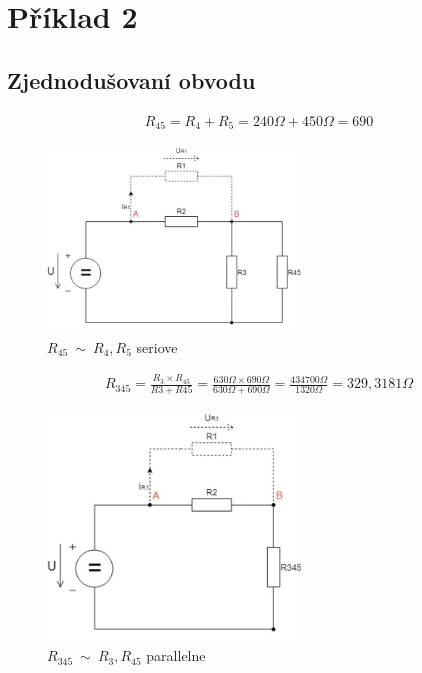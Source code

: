 \section{Příklad 2}
\subsection{Zjednodušovaní obvodu}
\begin{align*}
R_{45} = R_4 + R_5 = 240\Omega + 450\Omega = 690
\end{align*}

\begin{figure}[H]
    \centering
    \includegraphics[width=0.6\textwidth]{fig/Pr2_1.png}
    \caption{$R_{45}~\sim~R_4,R_5$ seriove}
\end{figure}


\begin{align*}
R_{345} = \frac {R_3 \times R_{45}} {R3 + R45} = \frac {630\Omega \times 690\Omega} {630\Omega + 690\Omega} = \frac {434 700\Omega} {1320\Omega} = 329,3181\Omega
\end{align*}

\begin{figure}[H]
    \centering
    \includegraphics[width=0.6\textwidth]{fig/Pr2_2.png}
    \caption{$R_{345}~\sim~R_3,R_{45}$ parallelne}
\end{figure}
